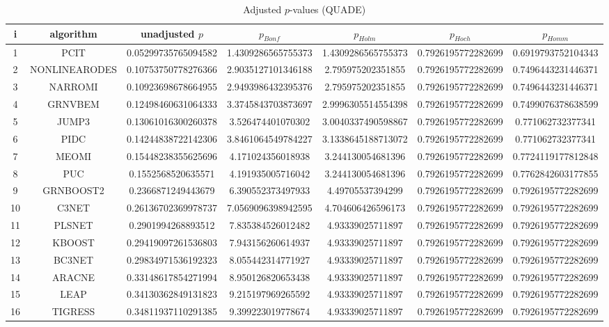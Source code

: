\documentclass[a4paper,10pt]{article}
\begin{document}
\begin{landscape}
\begin{table}[!htp]
\centering\scriptsize
\caption{Adjusted $p$-values (QUADE)}
\begin{tabular}{ccccccc}
i&algorithm&unadjusted $p$&$p_{Bonf}$&$p_{Holm}$&$p_{Hoch}$&$p_{Homm}$\\
\hline
1&PCIT&0.05299735765094582&1.4309286565755373&1.4309286565755373&0.7926195772282699&0.6919793752104343\\
2&NONLINEARODES&0.10753750778276366&2.9035127101346188&2.795975202351855&0.7926195772282699&0.7496443231446371\\
3&NARROMI&0.10923698678664955&2.9493986432395376&2.795975202351855&0.7926195772282699&0.7496443231446371\\
4&GRNVBEM&0.12498460631064333&3.3745843703873697&2.9996305514554398&0.7926195772282699&0.7499076378638599\\
5&JUMP3&0.13061016300260378&3.526474401070302&3.0040337490598867&0.7926195772282699&0.771062732377341\\
6&PIDC&0.14244838722142306&3.8461064549784227&3.1338645188713072&0.7926195772282699&0.771062732377341\\
7&MEOMI&0.15448238355625696&4.171024356018938&3.244130054681396&0.7926195772282699&0.7724119177812848\\
8&PUC&0.1552568520635571&4.191935005716042&3.244130054681396&0.7926195772282699&0.7762842603177855\\
9&GRNBOOST2&0.2366871249443679&6.390552373497933&4.49705537394299&0.7926195772282699&0.7926195772282699\\
10&C3NET&0.26136702369978737&7.0569096398942595&4.704606426596173&0.7926195772282699&0.7926195772282699\\
11&PLSNET&0.2901994268893512&7.835384526012482&4.93339025711897&0.7926195772282699&0.7926195772282699\\
12&KBOOST&0.29419097261536803&7.943156260614937&4.93339025711897&0.7926195772282699&0.7926195772282699\\
13&BC3NET&0.29834971536192323&8.055442314771927&4.93339025711897&0.7926195772282699&0.7926195772282699\\
14&ARACNE&0.33148617854271994&8.950126820653438&4.93339025711897&0.7926195772282699&0.7926195772282699\\
15&LEAP&0.34130362849131823&9.215197969265592&4.93339025711897&0.7926195772282699&0.7926195772282699\\
16&TIGRESS&0.34811937110291385&9.399223019778674&4.93339025711897&0.7926195772282699&0.7926195772282699\\

\end{tabular}
\end{table}
\end{landscape}
\end{document}
